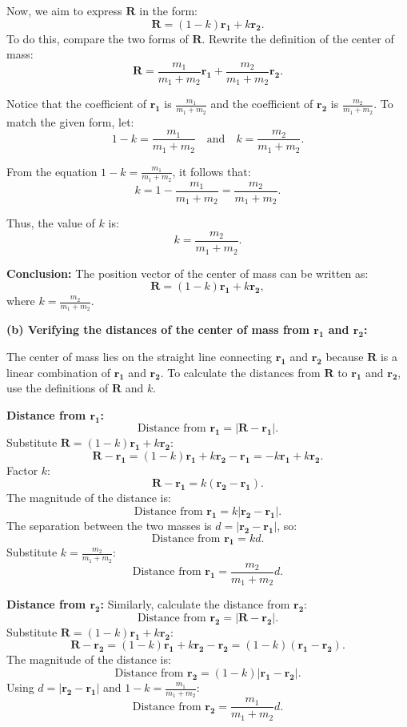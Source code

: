 Now, we aim to express $\mathbf{R}$ in the form:
\[
\mathbf{R} = (1 - k)\mathbf{r_1} + k\mathbf{r_2}.
\]
To do this, compare the two forms of $\mathbf{R}$. Rewrite the definition of the center of mass:
\[
\mathbf{R} = \frac{m_1}{m_1 + m_2}\mathbf{r_1} + \frac{m_2}{m_1 + m_2}\mathbf{r_2}.
\]

Notice that the coefficient of $\mathbf{r_1}$ is $\frac{m_1}{m_1 + m_2}$ and the coefficient of $\mathbf{r_2}$ is $\frac{m_2}{m_1 + m_2}$. To match the given form, let:
\[
1 - k = \frac{m_1}{m_1 + m_2} \quad \text{and} \quad k = \frac{m_2}{m_1 + m_2}.
\]

From the equation $1 - k = \frac{m_1}{m_1 + m_2}$, it follows that:
\[
k = 1 - \frac{m_1}{m_1 + m_2} = \frac{m_2}{m_1 + m_2}.
\]

Thus, the value of $k$ is:
\[
k = \frac{m_2}{m_1 + m_2}.
\]

\textbf{Conclusion:} The position vector of the center of mass can be written as:
\[
\mathbf{R} = (1 - k)\mathbf{r_1} + k\mathbf{r_2},
\]
where $k = \frac{m_2}{m_1 + m_2}$.

\textbf{(b) Verifying the distances of the center of mass from $\mathbf{r_1}$ and $\mathbf{r_2}$:}

The center of mass lies on the straight line connecting $\mathbf{r_1}$ and $\mathbf{r_2}$ because $\mathbf{R}$ is a linear combination of $\mathbf{r_1}$ and $\mathbf{r_2}$. To calculate the distances from $\mathbf{R}$ to $\mathbf{r_1}$ and $\mathbf{r_2}$, use the definitions of $\mathbf{R}$ and $k$.

\textbf{Distance from $\mathbf{r_1}$:}
\[
\text{Distance from } \mathbf{r_1} = |\mathbf{R} - \mathbf{r_1}|.
\]
Substitute $\mathbf{R} = (1 - k)\mathbf{r_1} + k\mathbf{r_2}$:
\[
\mathbf{R} - \mathbf{r_1} = (1 - k)\mathbf{r_1} + k\mathbf{r_2} - \mathbf{r_1} = -k\mathbf{r_1} + k\mathbf{r_2}.
\]
Factor $k$:
\[
\mathbf{R} - \mathbf{r_1} = k(\mathbf{r_2} - \mathbf{r_1}).
\]
The magnitude of the distance is:
\[
\text{Distance from } \mathbf{r_1} = k|\mathbf{r_2} - \mathbf{r_1}|.
\]
The separation between the two masses is $d = |\mathbf{r_2} - \mathbf{r_1}|$, so:
\[
\text{Distance from } \mathbf{r_1} = k d.
\]
Substitute $k = \frac{m_2}{m_1 + m_2}$:
\[
\text{Distance from } \mathbf{r_1} = \frac{m_2}{m_1 + m_2} d.
\]

\textbf{Distance from $\mathbf{r_2}$:}
Similarly, calculate the distance from $\mathbf{r_2}$:
\[
\text{Distance from } \mathbf{r_2} = |\mathbf{R} - \mathbf{r_2}|.
\]
Substitute $\mathbf{R} = (1 - k)\mathbf{r_1} + k\mathbf{r_2}$:
\[
\mathbf{R} - \mathbf{r_2} = (1 - k)\mathbf{r_1} + k\mathbf{r_2} - \mathbf{r_2} = (1 - k)(\mathbf{r_1} - \mathbf{r_2}).
\]
The magnitude of the distance is:
\[
\text{Distance from } \mathbf{r_2} = (1 - k)|\mathbf{r_1} - \mathbf{r_2}|.
\]
Using $d = |\mathbf{r_2} - \mathbf{r_1}|$ and $1 - k = \frac{m_1}{m_1 + m_2}$:
\[
\text{Distance from } \mathbf{r_2} = \frac{m_1}{m_1 + m_2} d.
\]


